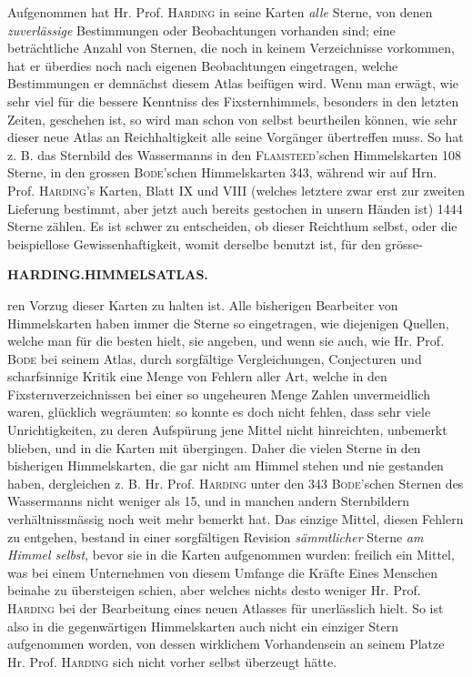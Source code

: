 Aufgenommen hat Hr. Prof. \textsc{Harding} in seine Karten \emph{alle} Sterne, von denen \emph{zuverlässige} Bestimmungen oder Beobachtungen vorhanden sind; eine beträchtliche Anzahl von Sternen, die noch in keinem Verzeichnisse vorkommen, hat er überdies noch nach eigenen Beobachtungen eingetragen, welche Bestimmungen er demnächst diesem Atlas beifügen wird. Wenn man erwägt, wie sehr viel für die bessere Kenntniss des Fixsternhimmels, besonders in den letzten Zeiten, geschehen ist, so wird man schon von selbst beurtheilen können, wie sehr dieser neue Atlas an Reichhaltigkeit alle seine Vorgänger übertreffen muss. So hat z. B. das Sternbild des Wassermanns in den \textsc{Flamsteed}'schen Himmelskarten 108 Sterne, in den grossen \textsc{Bode}'schen Himmelskarten 343, während wir auf Hrn. Prof. \textsc{Harding}'s Karten, Blatt IX und VIII (welches letztere zwar erst zur zweiten Lieferung bestimmt, aber jetzt auch bereits gestochen in unsern Händen ist) 1444 Sterne zählen. Es ist schwer zu entscheiden, ob dieser Reichthum selbst, oder die beispiellose Gewissenhaftigkeit, womit derselbe benutzt ist, für den grösse-\par
\clearpage
\thispagestyle{empty}
\noindent{}%
\makebox[12mm][l]{{}}%
\parbox[t]{\dimexpr\linewidth-24mm\relax}{\centering\footnotesize\bfseries HARDING.\enspace HIMMELSATLAS.\par}%
\par\medskip
\noindent ren Vorzug dieser Karten zu halten ist. Alle bisherigen Bearbeiter von Himmelskarten haben immer die Sterne so eingetragen, wie diejenigen Quellen, welche man für die besten hielt, sie angeben, und wenn sie auch, wie Hr. Prof. \textsc{Bode} bei seinem Atlas, durch sorgfältige Vergleichungen, Conjecturen und scharfsinnige Kritik eine Menge von Fehlern aller Art, welche in den Fixsternverzeichnissen bei einer so ungeheuren Menge Zahlen unvermeidlich waren, glücklich wegräumten: so konnte es doch nicht fehlen, dass sehr viele Unrichtigkeiten, zu deren Aufspürung jene Mittel nicht hinreichten, unbemerkt blieben, und in die Karten mit übergingen. Daher die vielen Sterne in den bisherigen Himmelskarten, die gar nicht am Himmel stehen und nie gestanden haben, dergleichen z. B. Hr. Prof. \textsc{Harding} unter den 343 \textsc{Bode}'schen Sternen des Wassermanns nicht weniger als 15, und in manchen andern Sternbildern verhältnissmässig noch weit mehr bemerkt hat. Das einzige Mittel, diesen Fehlern zu entgehen, bestand in einer sorgfältigen Revision \emph{sämmtlicher} Sterne \emph{am Himmel selbst}, bevor sie in die Karten aufgenommen wurden: freilich ein Mittel, was bei einem Unternehmen von diesem Umfange die Kräfte Eines Menschen beinahe zu übersteigen schien, aber welches nichts desto weniger Hr. Prof. \textsc{Harding} bei der Bearbeitung eines neuen Atlasses für unerlässlich hielt. So ist also in die gegenwärtigen Himmelskarten auch nicht ein einziger Stern aufgenommen worden, von dessen wirklichem Vorhandensein an seinem Platze Hr. Prof. \textsc{Harding} sich nicht vorher selbst überzeugt hätte.

